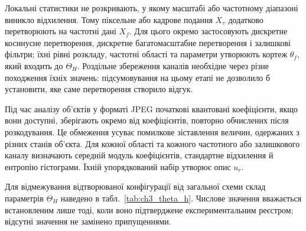 Локальні статистики не розкривають, у якому масштабі або частотному діапазоні виникло відхилення. Тому піксельне або кадрове подання $X_v$ додатково перетворюють на частотні дані $X_f$. Для цього окремо застосовують дискретне косинусне перетворення, дискретне багатомасштабне перетворення і залишкові фільтри; їхні рівні розкладу, частотні області та параметри утворюють кортеж $\theta_f$, який входить до $\Theta_H$. Роздільне збереження каналів необхідне через різне походження їхніх значень: підсумовування на цьому етапі не дозволило б установити, яке саме перетворення створило відгук.

Під час аналізу об’єктів у форматі JPEG початкові квантовані коефіцієнти, якщо вони доступні, зберігають окремо від коефіцієнтів, повторно обчислених після розкодування. Це обмеження усуває помилкове зіставлення величин, одержаних з різних станів об’єкта. Для кожної області та кожного частотного або залишкового каналу визначають середній модуль коефіцієнтів, стандартне відхилення й ентропію гістограми. Їхній упорядкований набір утворює опис $u_r$.

Для відмежування відтворюваної конфігурації від загальної схеми склад параметрів $\Theta_H$ наведено в табл.~\ref{tab:ch3_theta_h}. Числове значення вважається встановленим лише тоді, коли воно підтверджене експериментальним реєстром; відсутні значення не замінено припущеннями.

